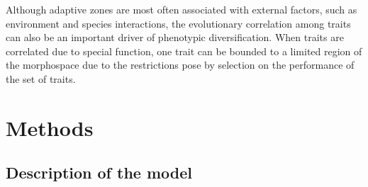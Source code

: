 
Although adaptive zones are most often associated with external factors, such as environment and species interactions, the evolutionary correlation among traits can also be an important driver of phenotypic diversification. When traits are correlated due to special function, one trait can be bounded to a limited region of the morphospace due to the restrictions pose by selection on the performance of the set of traits.


\section{Methods}

\subsection{Description of the model}

